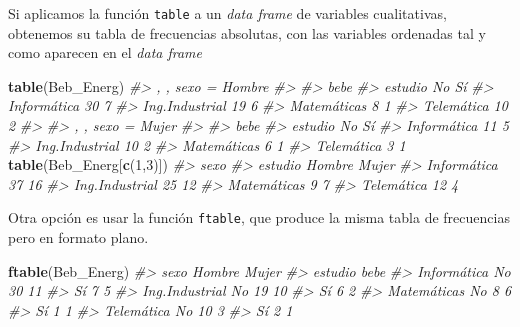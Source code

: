 \documentclass[
]{book}
\newenvironment{Shaded}{\begin{snugshade}}{\end{snugshade}}
\newcommand{\CommentTok}[1]{\textcolor[rgb]{0.56,0.35,0.01}{\textit{#1}}}
\newcommand{\DecValTok}[1]{\textcolor[rgb]{0.00,0.00,0.81}{#1}}
\newcommand{\KeywordTok}[1]{\textcolor[rgb]{0.13,0.29,0.53}{\textbf{#1}}}
\newcommand{\NormalTok}[1]{#1}
\theoremstyle{definition}
\theoremstyle{definition}
\theoremstyle{definition}
\theoremstyle{remark}
\begin{document}
Si aplicamos la función \texttt{table} a un \emph{data frame} de variables cualitativas, obtenemos su tabla de frecuencias absolutas, con las variables ordenadas tal y como aparecen en el \emph{data frame}

\begin{Shaded}
\begin{Highlighting}[]
\KeywordTok{table}\NormalTok{(Beb\_Energ)}
\CommentTok{\#\textgreater{} , , sexo = Hombre}
\CommentTok{\#\textgreater{} }
\CommentTok{\#\textgreater{}                 bebe}
\CommentTok{\#\textgreater{} estudio          No Sí}
\CommentTok{\#\textgreater{}   Informática    30  7}
\CommentTok{\#\textgreater{}   Ing.Industrial 19  6}
\CommentTok{\#\textgreater{}   Matemáticas     8  1}
\CommentTok{\#\textgreater{}   Telemática     10  2}
\CommentTok{\#\textgreater{} }
\CommentTok{\#\textgreater{} , , sexo = Mujer}
\CommentTok{\#\textgreater{} }
\CommentTok{\#\textgreater{}                 bebe}
\CommentTok{\#\textgreater{} estudio          No Sí}
\CommentTok{\#\textgreater{}   Informática    11  5}
\CommentTok{\#\textgreater{}   Ing.Industrial 10  2}
\CommentTok{\#\textgreater{}   Matemáticas     6  1}
\CommentTok{\#\textgreater{}   Telemática      3  1}
\KeywordTok{table}\NormalTok{(Beb\_Energ[}\KeywordTok{c}\NormalTok{(}\DecValTok{1}\NormalTok{,}\DecValTok{3}\NormalTok{)])}
\CommentTok{\#\textgreater{}                 sexo}
\CommentTok{\#\textgreater{} estudio          Hombre Mujer}
\CommentTok{\#\textgreater{}   Informática        37    16}
\CommentTok{\#\textgreater{}   Ing.Industrial     25    12}
\CommentTok{\#\textgreater{}   Matemáticas         9     7}
\CommentTok{\#\textgreater{}   Telemática         12     4}
\end{Highlighting}
\end{Shaded}

Otra opción es usar la función \texttt{ftable}, que produce la misma tabla de frecuencias pero en formato plano.

\begin{Shaded}
\begin{Highlighting}[]
\KeywordTok{ftable}\NormalTok{(Beb\_Energ)}
\CommentTok{\#\textgreater{}                     sexo Hombre Mujer}
\CommentTok{\#\textgreater{} estudio        bebe                  }
\CommentTok{\#\textgreater{} Informática    No            30    11}
\CommentTok{\#\textgreater{}                Sí             7     5}
\CommentTok{\#\textgreater{} Ing.Industrial No            19    10}
\CommentTok{\#\textgreater{}                Sí             6     2}
\CommentTok{\#\textgreater{} Matemáticas    No             8     6}
\CommentTok{\#\textgreater{}                Sí             1     1}
\CommentTok{\#\textgreater{} Telemática     No            10     3}
\CommentTok{\#\textgreater{}                Sí             2     1}
\end{Highlighting}
\end{Shaded}
\end{document}
